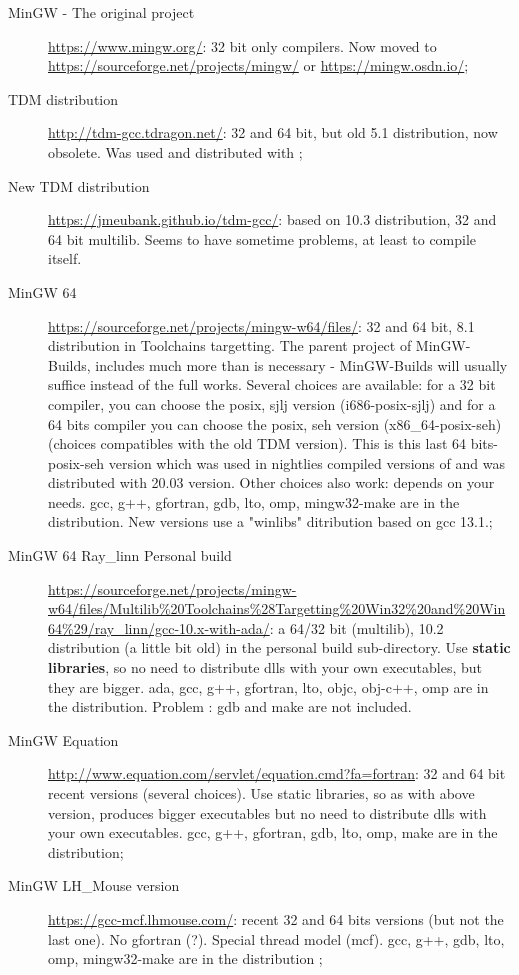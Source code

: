 \begin{description}
\item[MinGW - The original project] \url{https://www.mingw.org/}: 32 bit only compilers. Now moved to \url{https://sourceforge.net/projects/mingw/} or \url{https://mingw.osdn.io/};
\item[TDM distribution]\url{http://tdm-gcc.tdragon.net/}: 32 and 64 bit, but old 5.1 distribution, now obsolete. Was used and distributed with ;
\item[New TDM distribution]\url{https://jmeubank.github.io/tdm-gcc/}: based on 10.3 distribution, 32 and 64 bit multilib. Seems to have sometime problems, at least to compile \codeblocks itself.
\item[MinGW 64] \url{https://sourceforge.net/projects/mingw-w64/files/}: 32 and 64 bit, 8.1 distribution in Toolchains targetting. The parent project of MinGW-Builds, includes much more than is necessary - MinGW-Builds will usually suffice instead of the full works. Several choices are available: for a 32 bit compiler, you can choose the posix, sjlj version (i686-posix-sjlj) and for a 64 bits compiler you can choose the posix, seh version (x86\_64-posix-seh) (choices compatibles with the old TDM version). This is this last 64 bits-posix-seh version which was used in nightlies compiled versions of \codeblocks and was distributed with 20.03 version. Other choices also work: depends on your needs. gcc, g++, gfortran, gdb, lto, omp, mingw32-make are in the distribution. New  versions use a "winlibs" ditribution based on gcc 13.1.;
\item[MinGW 64 Ray\_linn Personal build] \url{https://sourceforge.net/projects/mingw-w64/files/Multilib%20Toolchains%28Targetting%20Win32%20and%20Win64%29/ray_linn/gcc-10.x-with-ada/}: a 64/32 bit (multilib), 10.2 distribution (a little bit old) in the personal build sub-directory. Use \textbf{static libraries}, so no need to distribute dlls with your own executables, but they are bigger. ada, gcc, g++, gfortran, lto, objc, obj-c++, omp are in the distribution. Problem : gdb and make are not included.
\item[MinGW Equation] \url{http://www.equation.com/servlet/equation.cmd?fa=fortran}: 32 and 64 bit recent versions (several choices). Use static libraries, so as with above version, produces bigger executables but no need to distribute dlls with your own executables.  gcc, g++, gfortran, gdb, lto, omp, make are in the distribution;
\item[MinGW LH\_Mouse version] \url{https://gcc-mcf.lhmouse.com/}: recent 32 and 64 bits versions (but not the last one). No gfortran (?). Special thread model (mcf).  gcc, g++, gdb, lto, omp, mingw32-make are in the distribution ;

\end{description}
